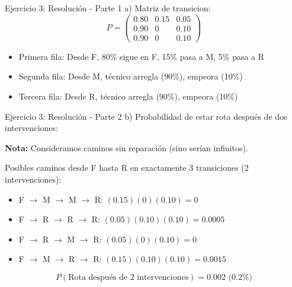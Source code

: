 \documentclass{beamer}
\begin{document}
\begin{frame}{Ejercicio 3: Resolución - Parte 1}
    a) Matriz de transicion:
    \[P = \begin{pmatrix}
    0.80 & 0.15 & 0.05 \\
    0.90 & 0 & 0.10 \\
    0.90 & 0 & 0.10
    \end{pmatrix}\]
    
    \begin{itemize}
        \item Primera fila: Desde F, 80\% sigue en F, 15\% pasa a M, 5\% pasa a R
        \item Segunda fila: Desde M, técnico arregla (90\%), empeora (10\%)
        \item Tercera fila: Desde R, técnico arregla (90\%), empeora (10\%)
    \end{itemize}
\end{frame}

\begin{frame}{Ejercicio 3: Resolución - Parte 2}
    \small
    b) Probabilidad de estar rota después de dos intervenciones:

    \vspace{0.5em}

    \textbf{Nota:} Consideramos caminos sin reparación (sino serían infinitos).

    \vspace{0.3em}

    Posibles caminos desde F hasta R en exactamente 3 transiciones (2 intervenciones):
    \begin{itemize}
        \item F $\rightarrow$ M $\rightarrow$ M $\rightarrow$ R: $(0.15)(0)(0.10) = 0$
        \item F $\rightarrow$ R $\rightarrow$ R $\rightarrow$ R: $(0.05)(0.10)(0.10) = 0.0005$
        \item F $\rightarrow$ R $\rightarrow$ M $\rightarrow$ R: $(0.05)(0)(0.10) = 0$
        \item F $\rightarrow$ M $\rightarrow$ R $\rightarrow$ R: $(0.15)(0.10)(0.10) = 0.0015$
    \end{itemize}

    \[
    P(\text{Rota después de 2 intervenciones}) = 0.002 \text{ (0.2\%)}
    \]
\end{frame}
\end{document}
